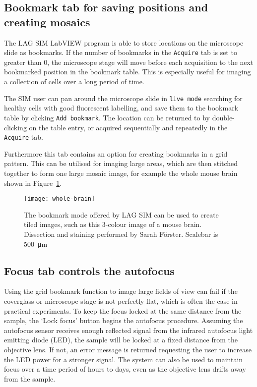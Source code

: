 \subsection{Bookmark tab for saving positions and creating mosaics} \label{sec:lagsimBookmarks}
The LAG SIM LabVIEW program is able to store locations on the microscope slide as bookmarks.
If the number of bookmarks in the \texttt{Acquire} tab is set to greater than 0, the microscope stage will move before each acquisition to the next bookmarked position in the bookmark table. 
This is especially useful for imaging a collection of cells over a long period of time. 

The SIM user can pan around the microscope slide in \texttt{live mode} searching for healthy cells with good fluorescent labelling, and save them to the bookmark table by clicking \texttt{Add bookmark}. 
The location can be returned to by double-clicking on the table entry, or acquired sequentially and repeatedly in the \texttt{Acquire} tab. 

Furthermore this tab contains an option for creating bookmarks in a grid pattern. 
This can be utilised for imaging large areas, which are then stitched together to form one large mosaic image, for example the whole mouse brain shown in Figure~\ref{fig:wholebrain}. 

\begin{figure}[p]
\centering
\texttt{[image: whole-brain]}
\caption[LAG SIM: An image of a full mouse brain can be captured as a mosaic of images]{The bookmark mode offered by LAG SIM can be used to create tiled images, such as this 3-colour image of a mouse brain. Dissection and staining performed by Sarah F{\"o}rster. Scalebar is \SI{500}{\micro\metre}}
\label{fig:wholebrain}
\end{figure}

\subsection{Focus tab controls the autofocus} \label{sec:lagsimFocus}
Using the grid bookmark function to image large fields of view can fail if the coverglass or microscope stage is not perfectly flat, which is often the case in practical experiments. 
To keep the focus locked at the same distance from the sample, the `Lock focus' button begins the autofocus procedure. 
Assuming the autofocus sensor receives enough reflected signal from the infrared autofocus light emitting diode (LED), the sample will be locked at a fixed distance from the objective lens. 
If not, an error message is returned requesting the user to increase the LED power for a stronger signal. 
The system can also be used to maintain focus over a time period of hours to days, even as the objective lens drifts away from the sample. 

